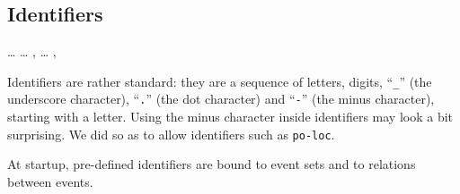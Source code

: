 \subsection{\label{language:identifier}Identifiers}
\begin{syntax}
 \is {} \ldots{}
\orelse  {} \ldots{}
\sep
{} \is {} \ldots{}
\sep
{} \is {} \brepet{}  \orelse {}
\orelse \T{\_} \orelse {} \orelse \T{-} \erepet
\end{syntax}
Identifiers are rather standard: they are a sequence of letters, digits,
``\texttt{\_}'' (the underscore character), ``\texttt{.}'' (the dot character)
and ``\texttt{-}'' (the minus character),
starting with a letter.
Using the minus character inside identifiers  may look a bit surprising.
We did so as to allow identifiers such as \texttt{po-loc}.

\label{sec:predef}At startup, pre-defined identifiers are bound to
event sets and to relations
between events.

